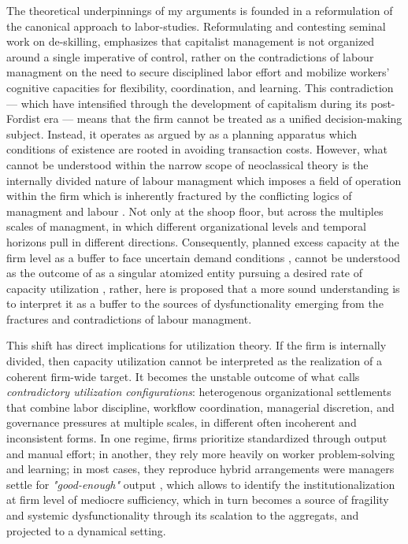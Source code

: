 The theoretical underpinnings of my arguments is founded in a reformulation of the canonical approach to labor-studies. Reformulating and contesting \citet{Braverman1974} seminal work on de-skilling, \citet{Vidal2022} emphasizes that capitalist management is not organized around a single imperative of control, rather on the contradictions of labour managment on the need to secure disciplined labor effort and mobilize workers’ cognitive capacities for flexibility, coordination, and learning. This contradiction --- which have intensified through the development of capitalism during its post-Fordist era --- means that the firm cannot be treated as a unified decision-making subject. Instead, it operates as argued by \citet{Coase1993} as a planning apparatus which conditions of existence are rooted in avoiding transaction costs. However, what cannot be understood within the narrow scope of neoclassical theory is the internally divided nature of labour managment which imposes a field of operation within the firm which is inherently fractured by the conflicting logics of managment and labour \citep{Vidal2022}. Not only at the shoop floor, but across the multiples scales of managment, in which different organizational levels and temporal horizons pull in different directions. Consequently, planned excess capacity at the firm level as a buffer to face uncertain demand conditions \citep{Steindl1952}, cannot be understood as the outcome of as a singular atomized entity pursuing a desired rate of capacity utilization \citep{Ciccone1986,Skott2012,Nikiforos2013}, rather, here is proposed that a more sound understanding is to interpret it as a buffer to the sources of dysfunctionality emerging from the fractures and contradictions of labour managment.

This shift has direct implications for utilization theory. If the firm is internally divided, then capacity utilization cannot be interpreted as the realization of a coherent firm-wide target. It becomes the unstable outcome of what calls \emph{contradictory utilization configurations}: heterogenous organizational settlements that combine labor discipline, workflow coordination, managerial discretion, and governance pressures at multiple scales, in different often incoherent and inconsistent forms. In one regime, firms prioritize standardized through output and manual effort; in another, they rely more heavily on worker problem-solving and learning; in most cases, they reproduce hybrid arrangements were managers settle for \emph{"good-enough"}  output \citep{Vidal2022}, which allows to identify the institutionalization at firm level of mediocre sufficiency, which in turn  becomes a source of fragility and systemic dysfunctionality through its scalation to the aggregats, and projected to a dynamical setting.

